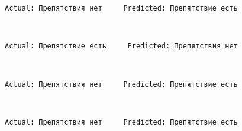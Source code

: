 \documentclass[11pt]{article}
\begin{document}
    \begin{Verbatim}[commandchars=\\\{\}]
Actual: Препятствия нет     Predicted: Препятствие есть

    \end{Verbatim}

    \begin{center}
    \end{center}
    { \hspace*{\fill} \\}
    
    \begin{Verbatim}[commandchars=\\\{\}]
Actual: Препятствие есть     Predicted: Препятствия нет

    \end{Verbatim}

    \begin{center}
    \end{center}
    { \hspace*{\fill} \\}
    
    \begin{Verbatim}[commandchars=\\\{\}]
Actual: Препятствия нет     Predicted: Препятствие есть

    \end{Verbatim}

    \begin{center}
    \end{center}
    { \hspace*{\fill} \\}
    
    \begin{Verbatim}[commandchars=\\\{\}]
Actual: Препятствия нет     Predicted: Препятствие есть

    \end{Verbatim}

    \begin{center}
    \end{center}
    { \hspace*{\fill} \\}
    
\end{document}

